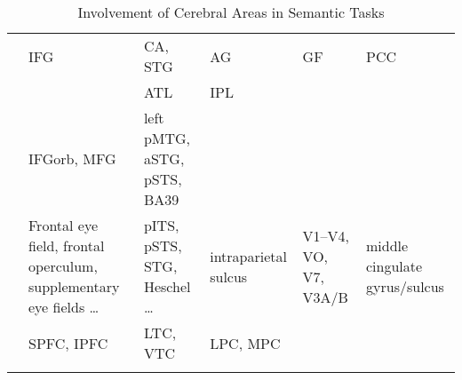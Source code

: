 
\begin{table}

    \centering
    
    \begin{tabularx}{\textwidth}{@{} A{4cm} *{5}{X} @{}}
    \toprule
     &  &  &  &  & \\
    \midrule
    \textcite{tsukiuraDissociableRolesBilateral2006} & IFG & CA, STG & AG & GF & PCC \\
    \textcite{pobricCategorySpecificCategoryGeneralSemantic2010} &  & ATL & IPL \\
    \textcite{turkenNeuralArchitectureLanguage2011} & IFGorb, MFG & left pMTG, aSTG, pSTS, BA39 & \\
    \textcite{huthContinuousSemanticSpace2012} & Frontal eye field, frontal operculum, supplementary eye fields \dots & pITS, pSTS, STG, Heschel \dots & intraparietal sulcus & V1--V4, VO, V7, V3A/B & middle cingulate gyrus/sulcus \\
    \textcite{huthNaturalSpeechReveals2016} & SPFC, IPFC & LTC, VTC & LPC, MPC & \\

    \bottomrule \\
    \end{tabularx}
    \caption{Involvement of Cerebral Areas in Semantic Tasks}
    \label{tab:distributedareastudysynthesis}
    \end{table}